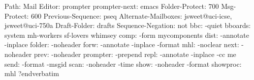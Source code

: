 
\verbatim
Path: Mail
Editor: prompter
prompter-next: emacs
Folder-Protect: 700
Msg-Protect: 600
Previous-Sequence: pseq
Alternate-Mailboxes: jsweet@uci-icse, jsweet@uci-750a
Draft-Folder: drafts
Sequence-Negation: not
bbc:      -quiet
bboards:  system mh-workers sf-lovers whimsey
comp:     -form mycomponents
dist:     -annotate -inplace
folder:   -noheader
forw:     -annotate -inplace -format
mhl:      -noclear
next:     -noheader
prev:     -noheader
prompter: -prepend
repl:     -annotate -inplace -cc me
send:     -format -msgid
scan:     -noheader -time
show:     -noheader -format
showproc: mhl
?endverbatim
